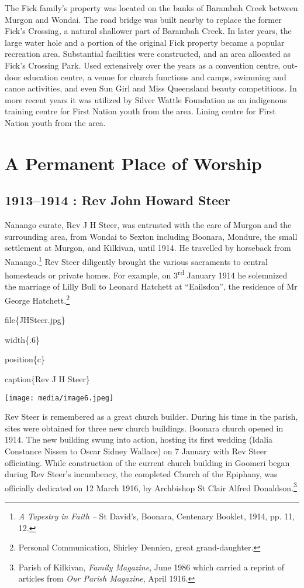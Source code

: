 The Fick family's property was located on the banks of Barambah Creek between Murgon and Wondai. The road bridge was built nearby to replace the former Fick's Crossing\emph{,} a natural shallower part of Barambah Creek. In later years, the large water hole and a portion of the original Fick property became a popular recreation area. Substantial facilities were constructed, and an area allocated as Fick's Crossing Park\emph{.} Used extensively over the years as a convention centre, out-door education centre, a venue for church functions and camps, swimming and canoe activities, and even Sun Girl and Miss Queensland beauty competitions. In more recent years it was utilized by Silver Wattle Foundation as an indigenous training centre for First Nation youth from the area. Lining centre for First Nation youth from the area.

\hypertarget{a-permanent-place-of-worship}{%
\chapter{A Permanent Place of Worship}\label{a-permanent-place-of-worship}}

\hypertarget{rev-john-howard-steer}{%
\section{1913--1914 : Rev John Howard Steer}\label{rev-john-howard-steer}}

Nanango curate, Rev J H Steer, was entrusted with the care of Murgon and the surrounding area, from Wondai to Sexton including Boonara, Mondure, the small settlement at Murgon, and Kilkivan, until 1914. He travelled by horseback from Nanango.\footnote{\emph{A Tapestry in Faith --} St David's, Boonara, Centenary Booklet, 1914, pp. 11, 12.} Rev Steer diligently brought the various sacraments to central homesteads or private homes. For example, on 3\textsuperscript{rd} January 1914 he solemnized the marriage of Lilly Bull to Leonard Hatchett at ``Eailsdon'', the residence of Mr George Hatchett.\footnote{Personal Communication, Shirley Dennien, great grand-daughter.}

file\{JHSteer.jpg\}

width\{.6\}

position\{c\}

caption\{Rev J H Steer\}

\texttt{[image: media/image6.jpeg]}

Rev Steer is remembered as a great church builder. During his time in the parish, sites were obtained for three new church buildings. Boonara church opened in 1914. The new building swung into action, hosting its first wedding (Idalia Constance Nissen to Oscar Sidney Wallace) on 7 January with Rev Steer officiating. While construction of the current church building in Goomeri began during Rev Steer's incumbency, the completed Church of the Epiphany, was officially dedicated on 12 March 1916, by Archbishop St Clair Alfred Donaldson.\footnote{Parish of Kilkivan, \emph{Family Magazine}, June 1986 which carried a reprint of articles from \emph{Our Parish Magazine}, April 1916.}

